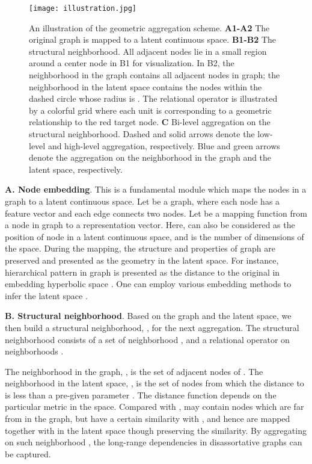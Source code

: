 \documentclass{article} \usepackage{iclr2020_conference,times}
\begin{document}
\begin{figure}[!tbh]
\begin{center}
\texttt{[image: illustration.jpg]}
\end{center} 
\caption{An illustration of the geometric aggregation scheme. \textbf{A1-A2} The original graph is mapped to a latent continuous space.
\textbf{B1-B2} The structural neighborhood. 
All adjacent nodes lie in a small region around a center node in B1 for visualization. 
In B2, the neighborhood in the graph contains all adjacent nodes in graph;
the neighborhood in the latent space contains the nodes within the dashed circle whose radius is . 
The relational operator  is illustrated by a colorful  grid where each unit is corresponding to a geometric relationship to the red target node. 
\textbf{C} Bi-level aggregation on the structural neighborhood. 
Dashed and solid arrows denote the low-level and high-level aggregation, respectively. 
Blue and green arrows denote the aggregation on the neighborhood in the graph and the latent space, respectively.}
\label{fig:illus}
\vspace{-2mm}
\end{figure}

\textbf{A. Node embedding}. 
This is a fundamental module which maps the nodes in a graph to a latent continuous space.
Let  be a graph, where each node  has a feature vector  and each edge  connects two nodes. 
Let   be a mapping function from a node in graph to a representation vector.
Here,  can also be considered as the position of node  in a latent continuous space, and  is the number of dimensions of the space. 
During the mapping, the structure and properties of graph are preserved and presented as the geometry in the latent space.
For instance, hierarchical pattern in graph is presented as the distance to the original in embedding hyperbolic space \citep{DBLP:conf/nips/NickelK17}. 
One can employ various embedding methods to infer the latent space \citep{cai2018comprehensive,DBLP:conf/icdm/WangC0XDSZ18}.


\textbf{B. Structural neighborhood}. 
Based on the graph and the latent space, we then build a structural neighborhood, ,  for the next aggregation.
The structural neighborhood consists of a set of neighborhood , and a relational operator on neighborhoods .

The neighborhood in the graph, , is the set of adjacent nodes of .
The neighborhood in the latent space, , is the set of nodes from which the distance to  is less than a pre-given parameter . The distance function  depends on the particular metric in the space.
Compared with ,  may contain nodes which are far from  in the graph, but have a certain similarity with , and hence are mapped together with  in the latent space though preserving the similarity.
By aggregating on such neighborhood , the long-range dependencies in disassortative graphs can be captured.
\end{document}
